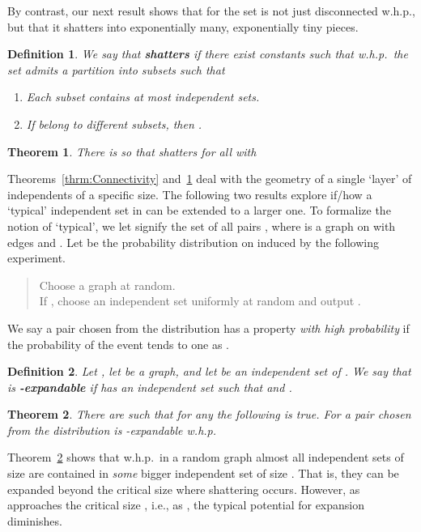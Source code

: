 \documentclass[a4paper,10pt]{article}
\newtheorem{definition}{Definition}\renewcommand{\thedefinition}{\arabic{definition}}
\newtheorem{theorem}{Theorem}\renewcommand{\thetheorem}{\arabic{theorem}}
\newcommand{\whp}{w.h.p.}
\newcommand\Thm{Theorem}
\begin{document}
By contrast, our next result shows that for 
the set  is not just disconnected \whp, but that
it shatters into exponentially many, exponentially tiny pieces.


\begin{definition}\label{Def_shattering}
We say that  {\bf shatters} if there exist constants
 such that \whp\ the set  admits a
partition into subsets such that
\begin{enumerate}
\item Each subset contains at most 
		independent sets.
\item If  belong to different subsets, then
	.
\end{enumerate}
\end{definition}


\begin{theorem}\label{theorem:shattering}
There is  so that  shatters for all
 with

\end{theorem}

\noindent
\Thm s~\ref{thrm:Connectivity} and~\ref{theorem:shattering} deal
with the geometry of a single `layer'  of independents
of a specific size. The following two results explore if/how a 
`typical' independent set in  can be extended 
to a larger one. To formalize the notion of `typical', we let
 signify the set of all pairs , where
 is a graph on  with  edges and
. Let  be the probability
distribution on   induced  by the following 
experiment.
\begin{quote}
Choose a graph  at random.\\
If ,
choose an independent set  uniformly at random
and output .
\end{quote}
We say a pair  chosen from the distribution 
has a property  \emph{with high probability} if the probability
of the event  tends to one as .



\begin{definition}
Let , let  be a graph, and let  be
an independent set of . We say that  is {\bf -expandable} if  has an independent set  such that 
 and
.
\end{definition}


\begin{theorem}\label{theorem:non-maximal}
There are  such that for any 
the following is true. For 	 a
pair  chosen from the distribution  is
-expandable \whp
\end{theorem}


\noindent
\Thm~\ref{theorem:non-maximal} shows that  \whp\ in a random graph
 almost all independent sets of size  are contained in \emph{some} bigger independent set of size
. That is, they can be expanded beyond
the critical size  where shattering occurs.
However, as  approaches the critical size ,
i.e., as , the typical potential for expansion diminishes.
\end{document}
